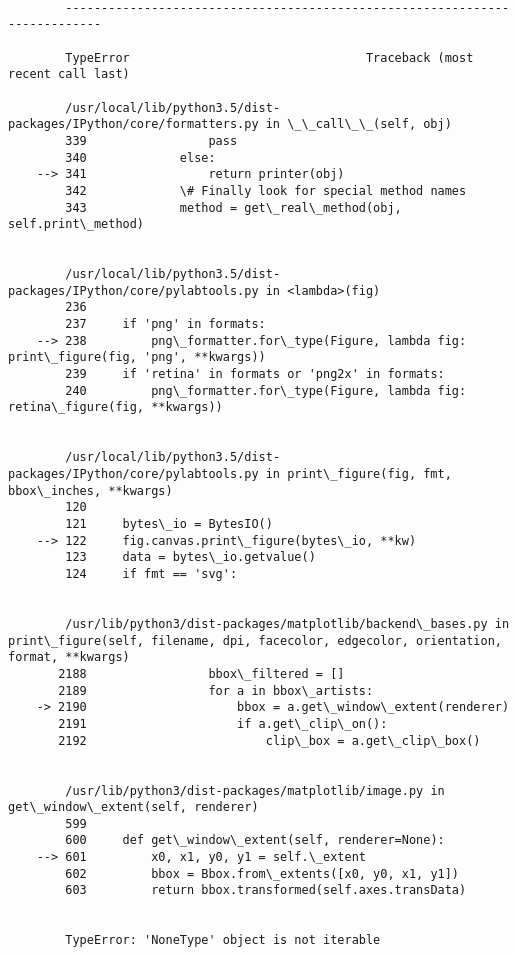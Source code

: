 \documentclass[11pt]{article}
\begin{document}
    \begin{Verbatim}[commandchars=\\\{\}]

        ---------------------------------------------------------------------------

        TypeError                                 Traceback (most recent call last)

        /usr/local/lib/python3.5/dist-packages/IPython/core/formatters.py in \_\_call\_\_(self, obj)
        339                 pass
        340             else:
    --> 341                 return printer(obj)
        342             \# Finally look for special method names
        343             method = get\_real\_method(obj, self.print\_method)


        /usr/local/lib/python3.5/dist-packages/IPython/core/pylabtools.py in <lambda>(fig)
        236 
        237     if 'png' in formats:
    --> 238         png\_formatter.for\_type(Figure, lambda fig: print\_figure(fig, 'png', **kwargs))
        239     if 'retina' in formats or 'png2x' in formats:
        240         png\_formatter.for\_type(Figure, lambda fig: retina\_figure(fig, **kwargs))


        /usr/local/lib/python3.5/dist-packages/IPython/core/pylabtools.py in print\_figure(fig, fmt, bbox\_inches, **kwargs)
        120 
        121     bytes\_io = BytesIO()
    --> 122     fig.canvas.print\_figure(bytes\_io, **kw)
        123     data = bytes\_io.getvalue()
        124     if fmt == 'svg':


        /usr/lib/python3/dist-packages/matplotlib/backend\_bases.py in print\_figure(self, filename, dpi, facecolor, edgecolor, orientation, format, **kwargs)
       2188                 bbox\_filtered = []
       2189                 for a in bbox\_artists:
    -> 2190                     bbox = a.get\_window\_extent(renderer)
       2191                     if a.get\_clip\_on():
       2192                         clip\_box = a.get\_clip\_box()


        /usr/lib/python3/dist-packages/matplotlib/image.py in get\_window\_extent(self, renderer)
        599 
        600     def get\_window\_extent(self, renderer=None):
    --> 601         x0, x1, y0, y1 = self.\_extent
        602         bbox = Bbox.from\_extents([x0, y0, x1, y1])
        603         return bbox.transformed(self.axes.transData)


        TypeError: 'NoneType' object is not iterable

    \end{Verbatim}
\end{document}
